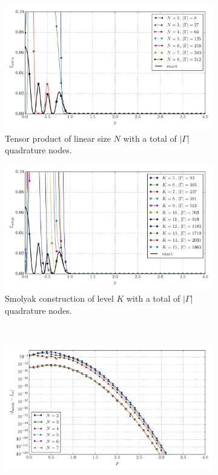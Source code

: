 \documentclass[a4paper,10pt]{article}
\begin{document}
\begin{figure}[ht!]
  \begin{subfigure}[t]{0.5\linewidth}
    \includegraphics[width=\linewidth]{./plots/tp_sg_3d_conv_p_(4,4,4)_(4,4,4)_val_nsd_tp.pdf}
    \caption{Tensor product of linear size $N$ with a total of $|\Gamma|$ quadrature nodes.}
    \label{fig:tp_sg_3d_conv_p_444_444_val_nsd_tp}
  \end{subfigure}
  \begin{subfigure}[t]{0.5\linewidth}
    \includegraphics[width=\linewidth]{./plots/tp_sg_3d_conv_p_(4,4,4)_(4,4,4)_val_nsd_gk.pdf}
    \caption{Smolyak construction of level $K$ with a total of $|\Gamma|$ quadrature nodes.}
    \label{fig:tp_sg_3d_conv_p_444_444_val_nsd_gk}
  \end{subfigure} \\
  \begin{subfigure}[t]{0.5\linewidth}
    \includegraphics[width=\linewidth]{./plots/tp_sg_3d_conv_p_(4,4,4)_(4,4,4)_err_nsd_tp.pdf}

\end{subfigure}
\end{figure}
\end{document}
